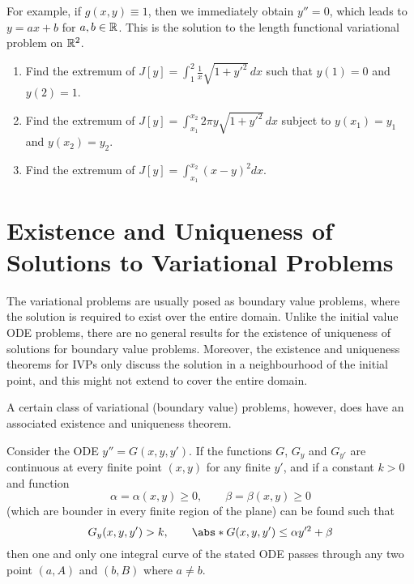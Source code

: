 \documentclass[11pt]{penrose}
\begin{document}
For example, if $g(x, y) \equiv 1$, then we immediately obtain $y'' = 0$, which leads to $y = ax + b$ for $a, b \in \mathbb{R}$. This is the solution to the length functional variational problem on $\mathbb{R}^2$.

\begin{nex}
\phantom{.}
    \begin{enumerate}[label=(\roman*)]
        \item Find the extremum of $J[y] = \int_{1}^{2} \frac{1}{x} \sqrt{1 + y'^2} \,dx$ such that $y(1) = 0$ and $y(2) = 1$.
        \item Find the extremum of $J[y] = \int_{x_1}^{x_2} 2\pi y \sqrt{1 + y'^2} \,dx$ subject to $y(x_1) = y_1$ and $y(x_2) = y_2$.
        \item Find the extremum of $J[y] = \int_{x_1}^{x_2} (x-y)^2 dx$.
    \end{enumerate}
\end{nex}

\section{Existence and Uniqueness of Solutions to Variational Problems}
The variational problems are usually posed as boundary value problems, where the solution is required to exist over the entire domain. Unlike the initial value ODE problems, there are no general results for the existence of uniqueness of solutions for boundary value problems. Moreover, the existence and uniqueness theorems for IVPs only discuss the solution in a neighbourhood of the initial point, and this might not extend to cover the entire domain.

A certain class of variational (boundary value) problems, however, does have an associated existence and uniqueness theorem.
\begin{nthm}[Bernstein]
    Consider the ODE $y'' = G(x, y, y')$. If the functions $G$, $G_y$ and $G_{y'}$ are continuous at every finite point $(x,y)$ for any finite $y'$, and if a constant $k > 0$ and function
    \begin{equation*}
        \alpha = \alpha(x,y) \geq 0,
        \qquad
        \beta = \beta(x,y) \geq 0
    \end{equation*}
    (which are bounder in every finite region of the plane) can be found such that
    \begin{equation*}
        G_y (x,y,y') > k,
        \qquad
        \abs*{G(x,y,y')} \leq \alpha y'^2 + \beta
    \end{equation*}
    then one and only one integral curve of the stated ODE passes through any two point $(a, A)$ and $(b, B)$ where $a \neq b$.
\end{nthm}
\end{document}
